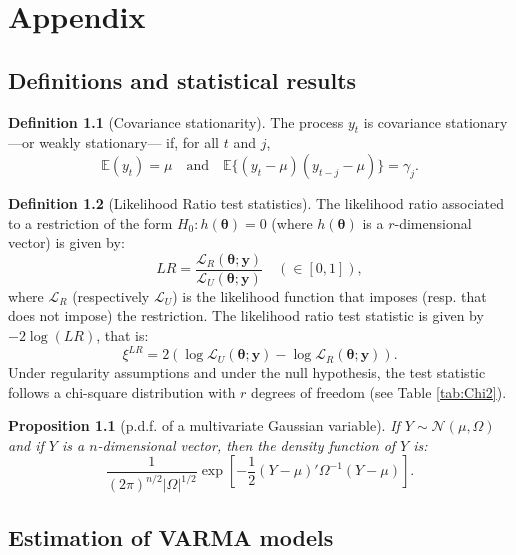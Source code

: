 \documentclass[
  12pt,
]{book}
\newtheorem{proposition}{Proposition}[chapter]
\theoremstyle{definition}
\newtheorem{definition}{Definition}[chapter]
\theoremstyle{definition}
\theoremstyle{definition}
\theoremstyle{definition}
\theoremstyle{remark}
\begin{document}
\chapter{Appendix}\label{append}

\section{Definitions and statistical results}\label{definitions-and-statistical-results}

\begin{definition}[Covariance stationarity]
\protect\hypertarget{def:covstat}{}\label{def:covstat}The process \(y_t\) is covariance stationary ---or weakly stationary--- if, for all \(t\) and \(j\),
\[
\mathbb{E}(y_t) = \mu \quad \mbox{and} \quad \mathbb{E}\{(y_t - \mu)(y_{t-j} - \mu)\} = \gamma_j.
\]
\end{definition}

\begin{definition}[Likelihood Ratio test statistics]
\protect\hypertarget{def:LR}{}\label{def:LR}The likelihood ratio associated to a restriction of the form \(H_0: h({\boldsymbol\theta})=0\) (where \(h({\boldsymbol\theta})\) is a \(r\)-dimensional vector) is given by:
\[
LR = \frac{\mathcal{L}_R(\boldsymbol\theta;\mathbf{y})}{\mathcal{L}_U(\boldsymbol\theta;\mathbf{y})} \quad (\in [0,1]),
\]
where \(\mathcal{L}_R\) (respectively \(\mathcal{L}_U\)) is the likelihood function that imposes (resp. that does not impose) the restriction. The likelihood ratio test statistic is given by \(-2\log(LR)\), that is:
\[
\boxed{\xi^{LR}= 2 (\log\mathcal{L}_U(\boldsymbol\theta;\mathbf{y})-\log\mathcal{L}_R(\boldsymbol\theta;\mathbf{y})).}
\]
Under regularity assumptions and under the null hypothesis, the test statistic follows a chi-square distribution with \(r\) degrees of freedom (see Table \ref{tab:Chi2}).
\end{definition}

\begin{proposition}[p.d.f. of a multivariate Gaussian variable]
\protect\hypertarget{prp:pdfMultivarGaussian}{}\label{prp:pdfMultivarGaussian}If \(Y \sim \mathcal{N}(\mu,\Omega)\) and if \(Y\) is a \(n\)-dimensional vector, then the density function of \(Y\) is:
\[
\frac{1}{(2 \pi)^{n/2}|\Omega|^{1/2}}\exp\left[-\frac{1}{2}\left(Y-\mu\right)'\Omega^{-1}\left(Y-\mu\right)\right].
\]
\end{proposition}

\section{Estimation of VARMA models}\label{AppEstimVARMA}
\end{document}
